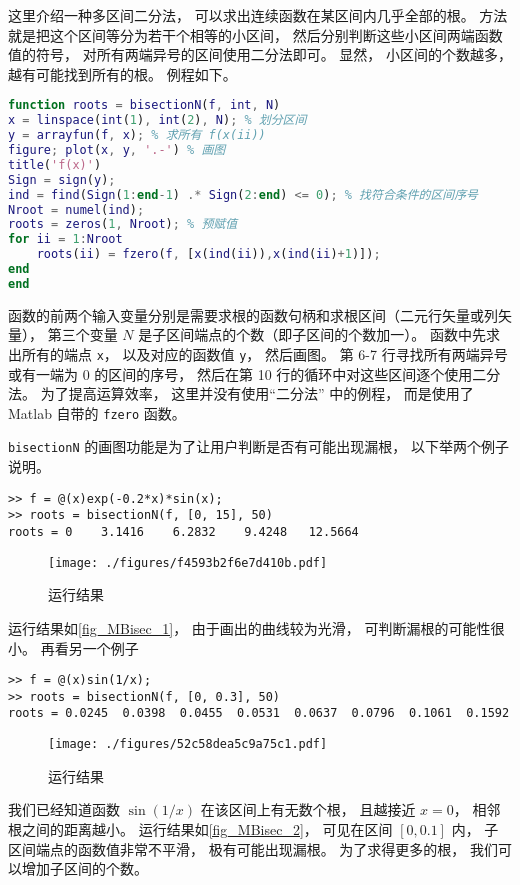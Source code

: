 

这里介绍一种多区间二分法， 可以求出连续函数在某区间内几乎全部的根。 方法就是把这个区间等分为若干个相等的小区间， 然后分别判断这些小区间两端函数值的符号， 对所有两端异号的区间使用二分法即可。 显然， 小区间的个数越多， 越有可能找到所有的根。 例程如下。

\begin{lstlisting}[language=matlab, caption=bisectionN.m]
function roots = bisectionN(f, int, N)
x = linspace(int(1), int(2), N); % 划分区间
y = arrayfun(f, x); % 求所有 f(x(ii))
figure; plot(x, y, '.-') % 画图
title('f(x)')
Sign = sign(y);
ind = find(Sign(1:end-1) .* Sign(2:end) <= 0); % 找符合条件的区间序号
Nroot = numel(ind);
roots = zeros(1, Nroot); % 预赋值
for ii = 1:Nroot
    roots(ii) = fzero(f, [x(ind(ii)),x(ind(ii)+1)]);  
end
end
\end{lstlisting}

函数的前两个输入变量分别是需要求根的函数句柄和求根区间（二元行矢量或列矢量）， 第三个变量 $N$ 是子区间端点的个数（即子区间的个数加一）。 函数中先求出所有的端点 \verb|x|， 以及对应的函数值 \verb|y|， 然后画图。 第 6-7 行寻找所有两端异号或有一端为 0 的区间的序号， 然后在第 10 行的循环中对这些区间逐个使用二分法。 为了提高运算效率， 这里并没有使用“二分法” 中的例程， 而是使用了 Matlab 自带的 \verb|fzero| 函数。

\verb|bisectionN| 的画图功能是为了让用户判断是否有可能出现漏根， 以下举两个例子说明。
\begin{lstlisting}[language=matlabC]
>> f = @(x)exp(-0.2*x)*sin(x);
>> roots = bisectionN(f, [0, 15], 50)
roots = 0    3.1416    6.2832    9.4248   12.5664
\end{lstlisting}
\begin{figure}[ht]
\centering
\texttt{[image: ./figures/f4593b2f6e7d410b.pdf]}
\caption{运行结果} \label{fig_MBisec_1}
\end{figure}
运行结果如\autoref{fig_MBisec_1}， 由于画出的曲线较为光滑， 可判断漏根的可能性很小。 再看另一个例子
\begin{lstlisting}[language=matlabC]
>> f = @(x)sin(1/x);
>> roots = bisectionN(f, [0, 0.3], 50)
roots = 0.0245  0.0398  0.0455  0.0531  0.0637  0.0796  0.1061  0.1592
\end{lstlisting}
\begin{figure}[ht]
\centering
\texttt{[image: ./figures/52c58dea5c9a75c1.pdf]}
\caption{运行结果} \label{fig_MBisec_2}
\end{figure}
我们已经知道函数 $\sin(1/x)$ 在该区间上有无数个根， 且越接近 $x = 0$， 相邻根之间的距离越小。 运行结果如\autoref{fig_MBisec_2}，  可见在区间 $[0, 0.1]$ 内， 子区间端点的函数值非常不平滑， 极有可能出现漏根。 为了求得更多的根， 我们可以增加子区间的个数。
